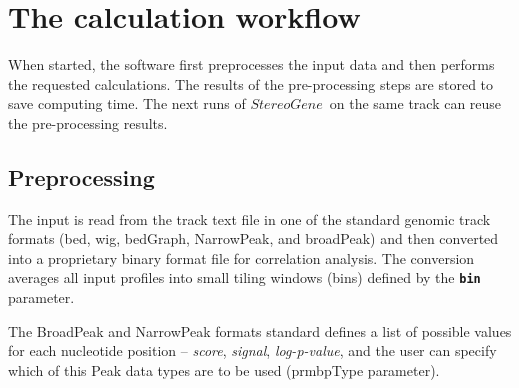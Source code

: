 \documentclass{article}
\newcommand{\prm}[1]{\texttt{\textbf{{#1}}}}
\newcommand{\sg}{$StereoGene$\ }
\begin{document}
\section{The calculation workflow}
When started, the software first preprocesses the input data and then performs the requested calculations. The results of the pre-processing steps are stored to save computing time. The next runs of \sg on the same track can reuse the pre-processing results.

\subsection{Preprocessing}
The input is read from the track text file in one of the standard genomic track formats (bed, wig, bedGraph, NarrowPeak, and broadPeak) and then converted into a proprietary binary format file for correlation analysis. The conversion averages all input profiles into small tiling windows (bins) defined by the \prm{bin} parameter. 

The BroadPeak and NarrowPeak formats standard defines a list of possible values for each nucleotide position -- \textit{score}, \textit{signal}, \textit{log-p-value}, and the user can specify which of this Peak data types are to be used (prm{bpType} parameter). 
\end{document}
